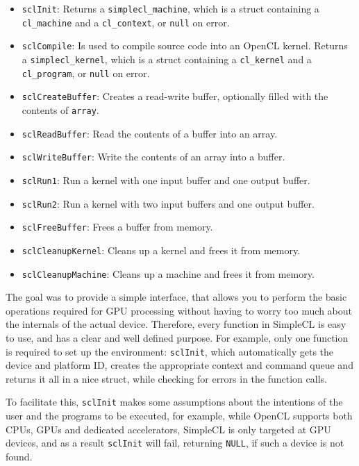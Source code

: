 \begin{itemize}
  \item \texttt{sclInit}: Returns a \texttt{simplecl\_machine},
    which is a struct containing a \texttt{cl\_machine} and a
    \texttt{cl\_context}, or \texttt{null} on error.
  \item \texttt{sclCompile}: Is used to compile source code into
    an OpenCL kernel. Returns a \texttt{simplecl\_kernel}, which is a
    struct containing a \texttt{cl\_kernel} and a
    \texttt{cl\_program}, or \texttt{null} on error.
  \item \texttt{sclCreateBuffer}: Creates a read-write buffer,
    optionally filled with the contents of \texttt{array}.
  \item \texttt{sclReadBuffer}: Read the contents of a buffer into an
    array.
  \item \texttt{sclWriteBuffer}: Write the contents of an array into a
    buffer.
  \item \texttt{sclRun1}: Run a kernel with one input buffer and one
    output buffer.
  \item \texttt{sclRun2}: Run a kernel with two input buffers and one
    output buffer.
  \item \texttt{sclFreeBuffer}: Frees a buffer from memory.
  \item \texttt{sclCleanupKernel}: Cleans up a kernel and frees it
    from memory.
  \item \texttt{sclCleanupMachine}: Cleans up a machine and frees it
    from memory.
\end{itemize}

The goal was to provide a simple interface, that allows you to perform
the basic operations required for GPU processing without having to
worry too much about the internals of the actual device. Therefore,
every function in SimpleCL is easy to use, and has a clear and well
defined purpose. For example, only one function is required to set up
the environment: \texttt{sclInit}, which automatically gets the device
and platform ID, creates the appropriate context and command queue and
returns it all in a nice struct, while checking for errors in the
function calls.

To facilitate this, \texttt{sclInit} makes some assumptions about the
intentions of the user and the programs to be executed, for example,
while OpenCL supports both CPUs, GPUs and dedicated accelerators,
SimpleCL is only targeted at GPU devices, and as a result
\texttt{sclInit} will fail, returning \texttt{NULL}, if such a device
is not found.

